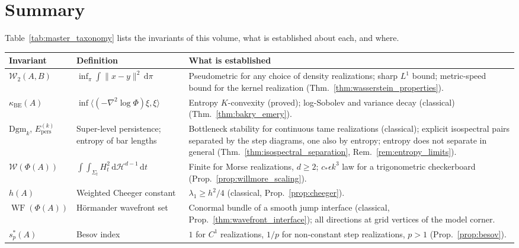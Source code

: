 \documentclass[11pt,a4paper,reqno]{amsart}
\theoremstyle{definition}
\numberwithin{equation}{section}
\newcommand{\dif}{\,\mathrm{d}}
\newcommand{\WF}{\operatorname{WF}}
\begin{document}
\section{Summary}
\label{sec:synthesis}

Table~\ref{tab:master_taxonomy} lists the invariants of this volume, what is established about each, and where.

\begin{table}[htbp]
\centering
\small
\renewcommand{\arraystretch}{1.2}
\begin{tabularx}{\textwidth}{@{} l >{\raggedright\arraybackslash}p{3.4cm} >{\raggedright\arraybackslash}X @{}}
\toprule
\textbf{Invariant} & \textbf{Definition} & \textbf{What is established} \\
\midrule
$\mathcal{W}_2(A, B)$ & $\inf_\pi \int \|x-y\|^2 \dif \pi$ & Pseudometric for any choice of density realizations; sharp $L^1$ bound; metric-speed bound for the kernel realization (Thm.~\ref{thm:wasserstein_properties}). \\
\midrule
$\kappa_{\mathrm{BE}}(A)$ & $\inf \langle (-\nabla^2 \log \Phi) \xi, \xi \rangle$ & Entropy $K$-convexity (proved); log-Sobolev and variance decay (classical) (Thm.~\ref{thm:bakry_emery}). \\
\midrule
$\mathrm{Dgm}_k$, $E^{(k)}_{\mathrm{pers}}$ & Super-level persistence; entropy of bar lengths & Bottleneck stability for continuous tame realizations (classical); explicit isospectral pairs separated by the step diagrams, one also by entropy; entropy does not separate in general (Thm.~\ref{thm:isospectral_separation}, Rem.~\ref{rem:entropy_limits}). \\
\midrule
$\mathcal{W}(\Phi(A))$ & $\int \int_{\Sigma_t} H_t^2 \dif \mathcal{H}^{d-1} \dif t$ & Finite for Morse realizations, $d \ge 2$; $c_*\epsilon k^3$ law for a trigonometric checkerboard (Prop.~\ref{prop:willmore_scaling}). \\
\midrule
$h(A)$ & Weighted Cheeger constant & $\lambda_1 \ge h^2/4$ (classical, Prop.~\ref{prop:cheeger}). \\
\midrule
$\WF(\Phi(A))$ & H\"ormander wavefront set & Conormal bundle of a smooth jump interface (classical, Prop.~\ref{thm:wavefront_interface}); all directions at grid vertices of the model corner. \\
\midrule
$s^*_p(A)$ & Besov index & $1$ for $C^1$ realizations, $1/p$ for non-constant step realizations, $p > 1$ (Prop.~\ref{prop:besov}). \\

\end{tabularx}
\end{table}
\end{document}
